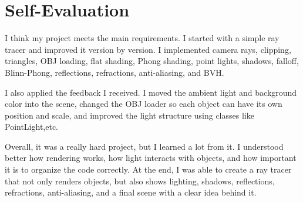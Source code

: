 \documentclass{article}
\begin{document}
\section{Self-Evaluation}

I think my project meets the main requirements. I started with a simple ray tracer and improved it version by version. I implemented camera rays, clipping, triangles, OBJ loading, flat shading, Phong shading, point lights, shadows, falloff, Blinn-Phong, reflections, refractions, anti-aliasing, and BVH.

I also applied the feedback I received. I moved the ambient light and background color into the scene, changed the OBJ loader so each object can have its own position and scale, and improved the light structure using classes like PointLight,etc.

Overall, it was a really hard project, but I learned a lot from it. I understood better how rendering works, how light interacts with objects, and how important it is to organize the code correctly. At the end, I was able to create a ray tracer that not only renders objects, but also shows lighting, shadows, reflections, refractions, anti-aliasing, and a final scene with a clear idea behind it.
\end{document}
